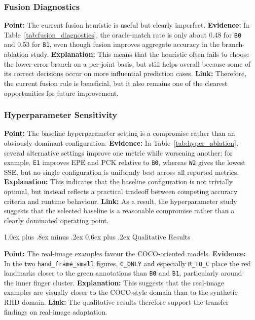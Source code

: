 \documentclass[10pt,letterpaper]{article}
\makeatletter
\renewcommand\subsection{\@startsection{subsection}{2}{\z@}%
  {1.0ex plus .8ex minus .2ex}%
  {0.6ex plus .2ex}%
  {\normalfont\itshape}}
\makeatother
\begin{document}
\subsubsection{Fusion Diagnostics}

\medskip
\noindent\textbf{Point:} The current fusion heuristic is useful but clearly imperfect.  
\textbf{Evidence:} In Table~\ref{tab:fusion_diagnostics}, the oracle-match rate is only about 0.48 for \texttt{B0} and 0.53 for \texttt{B1}, even though fusion improves aggregate accuracy in the branch-ablation study.  
\textbf{Explanation:} This means that the heuristic often fails to choose the lower-error branch on a per-joint basis, but still helps overall because some of its correct decisions occur on more influential prediction cases.  
\textbf{Link:} Therefore, the current fusion rule is beneficial, but it also remains one of the clearest opportunities for future improvement.

\subsubsection{Hyperparameter Sensitivity}

\medskip
\noindent\textbf{Point:} The baseline hyperparameter setting is a compromise rather than an obviously dominant configuration.  
\textbf{Evidence:} In Table~\ref{tab:hyper_ablation}, several alternative settings improve one metric while worsening another; for example, \texttt{E1} improves EPE and PCK relative to \texttt{B0}, whereas \texttt{W2} gives the lowest SSE, but no single configuration is uniformly best across all reported metrics.  
\textbf{Explanation:} This indicates that the baseline configuration is not trivially optimal, but instead reflects a practical tradeoff between competing accuracy criteria and runtime behaviour.  
\textbf{Link:} As a result, the hyperparameter study suggests that the selected baseline is a reasonable compromise rather than a clearly dominated operating point.

\subsection{Qualitative Results}

\medskip
\noindent\textbf{Point:} The real-image examples favour the COCO-oriented models.  
\textbf{Evidence:} In the two \texttt{hand\_frame\_small} figures, \texttt{C\_ONLY} and especially \texttt{R\_TO\_C} place the red landmarks closer to the green annotations than \texttt{B0} and \texttt{B1}, particularly around the inner finger cluster.  
\textbf{Explanation:} This suggests that the real-image examples are visually closer to the COCO-style domain than to the synthetic RHD domain.  
\textbf{Link:} The qualitative results therefore support the transfer findings on real-image adaptation.
\end{document}
